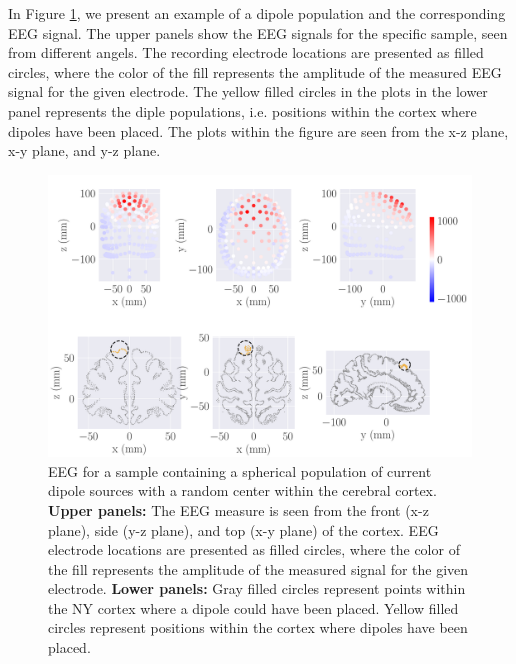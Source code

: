 \documentclass[a4paper, UKenglish, 11pt]{uiomaster}
\begin{document}
In Figure \ref{fig:dipole_area}, we present an example of a dipole population and the corresponding EEG signal. The upper panels show the EEG signals for the specific sample, seen from different angels. The recording electrode locations are presented as filled circles, where the color of the fill represents the amplitude of the measured EEG signal for the given electrode. The yellow filled circles in the plots in the lower panel represents the diple populations, i.e. positions within the cortex where dipoles have been placed. The plots within the figure are seen from the x-z plane, x-y plane, and y-z plane.

\begin{figure}[!htb]
\centering
\includegraphics[width=\linewidth]{figures/dipole_area_reduced_0.pdf}
\caption{EEG for a sample containing a spherical population of current dipole sources with a random center within the cerebral cortex.
\textbf{Upper panels:}
The EEG measure is seen from the front (x-z plane), side (y-z plane), and top (x-y plane) of the cortex. EEG electrode locations are presented as filled circles, where the color of the fill represents the amplitude of the measured signal for the given electrode.
\textbf{Lower panels:}
Gray filled circles represent points within the NY cortex where a dipole could have been placed. Yellow filled circles represent positions within the cortex where dipoles have been placed.}
\label{fig:dipole_area}
\end{figure}

\end{document}
